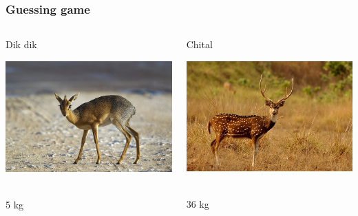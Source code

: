\documentclass{beamer}
\begin{document}
\begin{frame}
  \frametitle{Guessing game}
  \begin{columns}[c]
     \begin{block}{Dik dik}
      \begin{center}
        \includegraphics[height=.25\textheight]{640px-Madoqua_kirkii_-_female_(Namutoni).jpg}\
      \end{center}
      5 kg
    \end{block}
    
     \begin{block}{Chital}
      \begin{center}
        \includegraphics[height=.25\textheight]{640px-A_chital_stag_1.jpg}\
      \end{center}
      36 kg
    \end{block}


\end{columns}
\end{frame}
\end{document}
